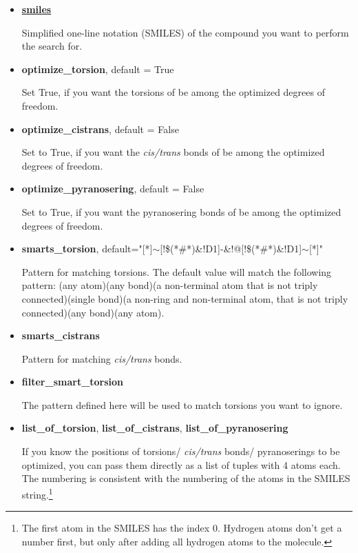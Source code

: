 \documentclass[a4paper]{article}
\begin{document}
\begin{itemize}

	
    \item{\underline{\textbf{\large{smiles}}}}
	
Simplified one-line notation (SMILES) of the compound you want to perform the search for.  
	\item{\textbf{optimize\_torsion}}, default = True 

Set True, if you want the torsions of be among the optimized degrees of freedom.

	\item{\textbf{optimize\_cistrans}}, default = False

Set to True, if you want the \textit{cis/trans} bonds of be among the optimized degrees of freedom.

	\item{\textbf{optimize\_pyranosering}}, default = False

Set to True, if you want the pyranosering bonds of be among the optimized degrees of freedom.

	\item{\textbf{smarts\_torsion}}, default="[*]$\sim$[!\$(*\#*)\&!D1]-\&!@[!\$(*\#*)\&!D1]$\sim$[*]"

Pattern for matching torsions. The default value will match the following pattern: (any atom)(any bond)(a non-terminal atom that is not triply connected)(single bond)(a non-ring and non-terminal atom, that is not triply connected)(any bond)(any atom). 

	\item{\textbf{smarts\_cistrans}}

Pattern for matching \textit{cis/trans} bonds. 

	\item{\textbf{filter\_smart\_torsion}}

The pattern defined here will be used to match torsions you want to ignore. 

	\item{\textbf{list\_of\_torsion}, \textbf{list\_of\_cistrans}, \textbf{list\_of\_pyranosering}}

If you know the positions of torsions/ \textit{cis/trans} bonds/ pyranoserings to be optimized, you can pass them directly as a list of tuples with 4 atoms each. The numbering is consistent with the numbering of the atoms in the SMILES string.\footnote{The first atom in the SMILES has the index 0. Hydrogen atoms don't get a number first, but only after adding all hydrogen atoms to the molecule.}


\end{itemize}
\end{document}

